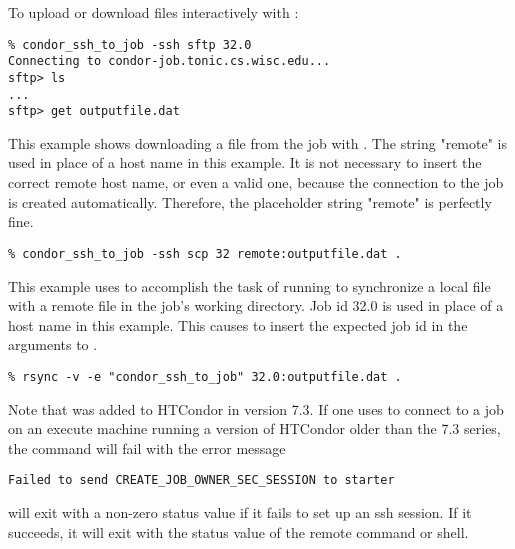 \begin{ManPage}
To upload or download files interactively with :
\footnotesize
\begin{verbatim}
% condor_ssh_to_job -ssh sftp 32.0
Connecting to condor-job.tonic.cs.wisc.edu...
sftp> ls
...
sftp> get outputfile.dat
\end{verbatim}
\normalsize

This example shows downloading a file from the job with .
The string "remote" is used in place of a host name in this example.
It is not necessary to insert the correct remote host name, or even
a valid one, because the connection to the job is created automatically.
Therefore, the placeholder string "remote" is perfectly fine.
\footnotesize
\begin{verbatim}
% condor_ssh_to_job -ssh scp 32 remote:outputfile.dat .
\end{verbatim}
\normalsize

This example uses  to accomplish the
task of running  to synchronize a local file with
a remote file in the job's working directory.
Job id 32.0 is used in place of a host name in this example.
This causes  to insert the expected job id in the
arguments to .
\footnotesize
\begin{verbatim}
% rsync -v -e "condor_ssh_to_job" 32.0:outputfile.dat .
\end{verbatim}
\normalsize

Note that  was added to HTCondor in version 7.3.  
If  one uses  to connect to a job
on an execute machine running a version of HTCondor older than the 7.3 series,
the command will fail with the error message
\begin{verbatim}
Failed to send CREATE_JOB_OWNER_SEC_SESSION to starter
\end{verbatim}

\ExitStatus

 will exit with a non-zero status value if it fails
to set up an ssh session.  If it succeeds, it will exit with the
status value of the remote command or shell.

\end{ManPage}
